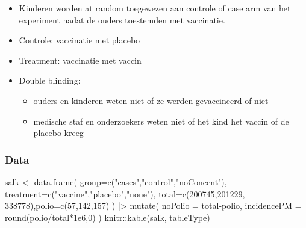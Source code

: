 \documentclass[
  dutch,
  letterpaper,
  12pt]{book}
\newenvironment{Shaded}{\begin{snugshade}}{\end{snugshade}}
\newcommand{\AttributeTok}[1]{\textcolor[rgb]{0.40,0.45,0.13}{#1}}
\newcommand{\DecValTok}[1]{\textcolor[rgb]{0.68,0.00,0.00}{#1}}
\newcommand{\FloatTok}[1]{\textcolor[rgb]{0.68,0.00,0.00}{#1}}
\newcommand{\FunctionTok}[1]{\textcolor[rgb]{0.28,0.35,0.67}{#1}}
\newcommand{\NormalTok}[1]{\textcolor[rgb]{0.00,0.23,0.31}{#1}}
\newcommand{\OtherTok}[1]{\textcolor[rgb]{0.00,0.23,0.31}{#1}}
\newcommand{\SpecialCharTok}[1]{\textcolor[rgb]{0.37,0.37,0.37}{#1}}
\newcommand{\StringTok}[1]{\textcolor[rgb]{0.13,0.47,0.30}{#1}}
\newcounter{none} %
\providecommand{\tightlist}{%
  \setlength{\itemsep}{0pt}\setlength{\parskip}{0pt}}
\theoremstyle{definition}
\theoremstyle{definition}
\theoremstyle{definition}
\theoremstyle{remark}
\begin{document}
\begin{itemize}
\tightlist
\item
  Kinderen worden at random toegewezen aan controle of case arm van het
  experiment nadat de ouders toestemden met vaccinatie.
\item
  Controle: vaccinatie met placebo
\item
  Treatment: vaccinatie met vaccin
\item
  Double blinding:

  \begin{itemize}
  \tightlist
  \item
    ouders en kinderen weten niet of ze werden gevaccineerd of niet
  \item
    medische staf en onderzoekers weten niet of het kind het vaccin of
    de placebo kreeg
  \end{itemize}
\end{itemize}

\subsubsection{Data}\label{data-1}

\begin{Shaded}
\begin{Highlighting}[]
\NormalTok{salk }\OtherTok{\textless{}{-}} \FunctionTok{data.frame}\NormalTok{(}
  \AttributeTok{group=}\FunctionTok{c}\NormalTok{(}\StringTok{"cases"}\NormalTok{,}\StringTok{"control"}\NormalTok{,}\StringTok{"noConcent"}\NormalTok{),}
  \AttributeTok{treatment=}\FunctionTok{c}\NormalTok{(}\StringTok{"vaccine"}\NormalTok{,}\StringTok{"placebo"}\NormalTok{,}\StringTok{"none"}\NormalTok{),}
  \AttributeTok{total=}\FunctionTok{c}\NormalTok{(}\DecValTok{200745}\NormalTok{,}\DecValTok{201229}\NormalTok{, }\DecValTok{338778}\NormalTok{),}\AttributeTok{polio=}\FunctionTok{c}\NormalTok{(}\DecValTok{57}\NormalTok{,}\DecValTok{142}\NormalTok{,}\DecValTok{157}\NormalTok{)}
\NormalTok{  ) }\SpecialCharTok{|\textgreater{}}
  \FunctionTok{mutate}\NormalTok{(}
    \AttributeTok{noPolio =}\NormalTok{ total}\SpecialCharTok{{-}}\NormalTok{polio,}
    \AttributeTok{incidencePM =} \FunctionTok{round}\NormalTok{(polio}\SpecialCharTok{/}\NormalTok{total}\SpecialCharTok{*}\FloatTok{1e6}\NormalTok{,}\DecValTok{0}\NormalTok{)}
\NormalTok{    )}
\NormalTok{knitr}\SpecialCharTok{::}\FunctionTok{kable}\NormalTok{(salk, tableType)}
\end{Highlighting}
\end{Shaded}
\end{document}
